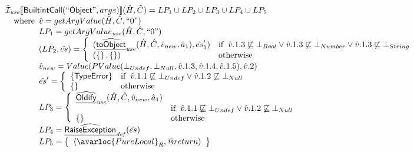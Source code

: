 \[\begin{array}{l}
\aI_{\it use}\lbr \SF{BuiltintCall}(``\SF{Object}",args)\rbr(\hat{H},\hat{C}) = LP_1 \cup LP_2 \cup LP_3 \cup LP_4 \cup LP_5\\
\quad\wherec{
  \hat{v} = getArgValue(\hat{H}, \hat{C}, ``0")\\
  LP_1 = getArgValue_{\it use}(\hat{H}, \hat{C}, ``0")\\
  (LP_2, \hat{es}) = \left\{\begin{array}{ll}
      (\ahf{toObject}_{\it use}(\hat{H},\hat{C}, \hat{v}_{new}, \hat{a}_1), \hat{es}_1')
      & \ifc{\hat{v}.1.3 \not\sqsubseteq \bot_{Bool} \lor \hat{v}.1.3 \not\sqsubseteq \bot_{Number} \lor \hat{v}.1.3 \not\sqsubseteq \bot_{String}}\\
      (\set{}, \set{}) & \owc
    \end{array}\right.\\
  \hat{v}_{new} = Value(PValue(\bot_{Undef}, \bot_{Null}, \hat{v}.1.3, \hat{v}.1.4, \hat{v}.1.5), \hat{v}.2)\\
  \hat{es}' = \left\{\begin{array}{ll}
      \{ \SF{TypeError} \}
      & \ifc{\hat{v}.1.1 \not\sqsubseteq \bot_{Undef} \lor \hat{v}.1.2 \not\sqsubseteq \bot_{Null}}\\
      \set{} & \owc
    \end{array}\right.\\
  LP_3 = \left\{\begin{array}{ll}
      \ahf{Oldify}_{\it use}(\hat{H},\hat{C}, \hat{v}_{new}, \hat{a}_1)\\
      & \ifc{\hat{v}.1.1 \not\sqsubseteq \bot_{Undef} \lor \hat{v}.1.2 \not\sqsubseteq \bot_{Null}}\\
      \set{} & \owc
    \end{array}\right.\\
  LP_4 = \ahf{RaiseException}_{\it def}(\hat{es})\\
  LP_5 = \set{\langle\avarloc{PureLocal}_R,\varprop{return}\rangle}\\
  }\\
\\



\end{array}\]
